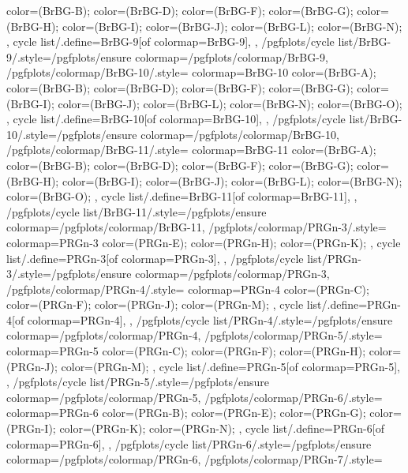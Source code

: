 {{{      color=(BrBG-B);
      color=(BrBG-D);
      color=(BrBG-F);
      color=(BrBG-G);
      color=(BrBG-H);
      color=(BrBG-I);
      color=(BrBG-J);
      color=(BrBG-L);
      color=(BrBG-N);
    },
    cycle list/.define={BrBG-9}{[of colormap=BrBG-9]},
  },
  /pgfplots/cycle list/BrBG-9/.style={/pgfplots/ensure colormap={/pgfplots/colormap/BrBG-9}},
  /pgfplots/colormap/BrBG-10/.style={
    colormap={BrBG-10}{
      color=(BrBG-A);
      color=(BrBG-B);
      color=(BrBG-D);
      color=(BrBG-F);
      color=(BrBG-G);
      color=(BrBG-I);
      color=(BrBG-J);
      color=(BrBG-L);
      color=(BrBG-N);
      color=(BrBG-O);
    },
    cycle list/.define={BrBG-10}{[of colormap=BrBG-10]},
  },
  /pgfplots/cycle list/BrBG-10/.style={/pgfplots/ensure colormap={/pgfplots/colormap/BrBG-10}},
  /pgfplots/colormap/BrBG-11/.style={
    colormap={BrBG-11}{
      color=(BrBG-A);
      color=(BrBG-B);
      color=(BrBG-D);
      color=(BrBG-F);
      color=(BrBG-G);
      color=(BrBG-H);
      color=(BrBG-I);
      color=(BrBG-J);
      color=(BrBG-L);
      color=(BrBG-N);
      color=(BrBG-O);
    },
    cycle list/.define={BrBG-11}{[of colormap=BrBG-11]},
  },
  /pgfplots/cycle list/BrBG-11/.style={/pgfplots/ensure colormap={/pgfplots/colormap/BrBG-11}},
  /pgfplots/colormap/PRGn-3/.style={
    colormap={PRGn-3}{
      color=(PRGn-E);
      color=(PRGn-H);
      color=(PRGn-K);
    },
    cycle list/.define={PRGn-3}{[of colormap=PRGn-3]},
  },
  /pgfplots/cycle list/PRGn-3/.style={/pgfplots/ensure colormap={/pgfplots/colormap/PRGn-3}},
  /pgfplots/colormap/PRGn-4/.style={
    colormap={PRGn-4}{
      color=(PRGn-C);
      color=(PRGn-F);
      color=(PRGn-J);
      color=(PRGn-M);
    },
    cycle list/.define={PRGn-4}{[of colormap=PRGn-4]},
  },
  /pgfplots/cycle list/PRGn-4/.style={/pgfplots/ensure colormap={/pgfplots/colormap/PRGn-4}},
  /pgfplots/colormap/PRGn-5/.style={
    colormap={PRGn-5}{
      color=(PRGn-C);
      color=(PRGn-F);
      color=(PRGn-H);
      color=(PRGn-J);
      color=(PRGn-M);
    },
    cycle list/.define={PRGn-5}{[of colormap=PRGn-5]},
  },
  /pgfplots/cycle list/PRGn-5/.style={/pgfplots/ensure colormap={/pgfplots/colormap/PRGn-5}},
  /pgfplots/colormap/PRGn-6/.style={
    colormap={PRGn-6}{
      color=(PRGn-B);
      color=(PRGn-E);
      color=(PRGn-G);
      color=(PRGn-I);
      color=(PRGn-K);
      color=(PRGn-N);
    },
    cycle list/.define={PRGn-6}{[of colormap=PRGn-6]},
  },
  /pgfplots/cycle list/PRGn-6/.style={/pgfplots/ensure colormap={/pgfplots/colormap/PRGn-6}},
  /pgfplots/colormap/PRGn-7/.style={
}}
